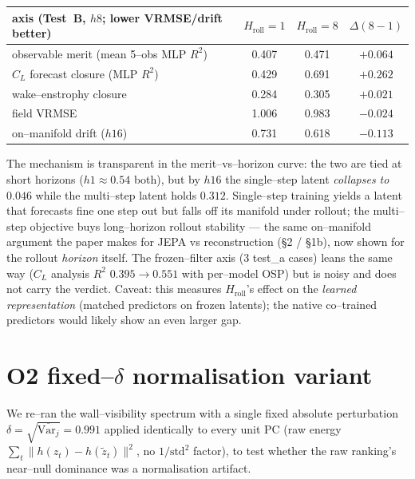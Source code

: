 \documentclass[11pt]{article}
\begin{document}
\begin{center}
\begin{tabular}{@{}lccc@{}}
\toprule
axis (Test~B, $h8$; lower VRMSE/drift better) & $H_{\text{roll}}{=}1$ & $H_{\text{roll}}{=}8$ & $\Delta(8{-}1)$ \\
\midrule
observable merit (mean 5--obs MLP $R^2$) & 0.407 & 0.471 & $\mathbf{+0.064}$ \\
$C_L$ forecast closure (MLP $R^2$)        & 0.429 & 0.691 & $\mathbf{+0.262}$ \\
wake--enstrophy closure                   & 0.284 & 0.305 & $+0.021$ \\
field VRMSE                               & 1.006 & 0.983 & $-0.024$ \\
on--manifold drift ($h16$)               & 0.731 & 0.618 & $-0.113$ \\
\bottomrule
\end{tabular}
\end{center}

The mechanism is transparent in the merit--vs--horizon curve: the two are tied at short horizons
($h1\approx 0.54$ both), but by $h16$ the single--step latent \emph{collapses to $0.046$} while the
multi--step latent holds $0.312$. Single--step training yields a latent that forecasts fine one
step out but falls off its manifold under rollout; the multi--step objective buys long--horizon
rollout stability --- the same on--manifold argument the paper makes for JEPA vs reconstruction
(\S2 / \S1b), now shown for the rollout \emph{horizon} itself. The frozen--filter axis (3 test\_a
cases) leans the same way ($C_L$ analysis $R^2$ $0.395\to 0.551$ with per--model OSP) but is noisy
and does not carry the verdict. Caveat: this measures $H_{\text{roll}}$'s effect on the
\emph{learned representation} (matched predictors on frozen latents); the native co--trained
predictors would likely show an even larger gap.

\section{O2 fixed--$\delta$ normalisation variant}
We re--ran the wall--visibility spectrum with a single fixed absolute perturbation
$\delta = \sqrt{\overline{\mathrm{Var}_j}} = 0.991$ applied identically to every unit PC (raw
energy $\sum_t \|h(z_t)-h(\tilde z_t)\|^2$, no $1/\text{std}^2$ factor), to test whether the
raw ranking's near--null dominance was a normalisation artifact.
\end{document}

